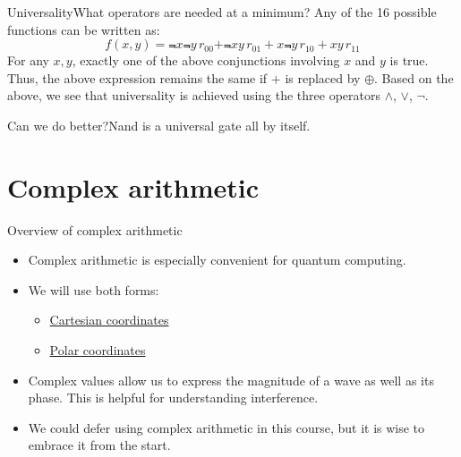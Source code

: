 \begin{frame}{Universality}{What operators are needed at a minimum?}
\MedSkip{}
Any of the 16 possible functions can be written as:
\[
f(x,y) = \Not{x}\Not{y}\,r_{00} +\Not{x}y \,r_{01} + x\Not{y}\, r_{10} +xy \,r_{11} 
\]
For any $x,y$, exactly one of the above conjunctions involving $x$ and $y$ is true.  Thus, the above expression remains the same if $+$ is replaced by $\oplus$.  
\MedSkip{}
Based on the above, we see that universality is achieved using the three operators $\wedge$, $\vee$, $\neg$.
\end{frame}



\begin{frame}{Can we do better?}{Nand is a universal gate all by itself.}

\end{frame}

\section{Complex arithmetic}

\begin{frame}{Overview of complex arithmetic}
\begin{itemize}
    \item Complex arithmetic is especially convenient for quantum computing.
    \item We will use both forms:
    \begin{itemize}
        \item \href{https://en.wikipedia.org/wiki/Cartesian_coordinate_system}{Cartesian coordinates}
        \item \href{https://en.wikipedia.org/wiki/Polar_coordinate_system}{Polar coordinates}
    \end{itemize}
    \item Complex values allow us to express the magnitude of a wave as well as its phase.  This is helpful for understanding interference.
    \item We could defer using complex arithmetic in this course, but it is wise to embrace it from the start.
\end{itemize}
\end{frame}

